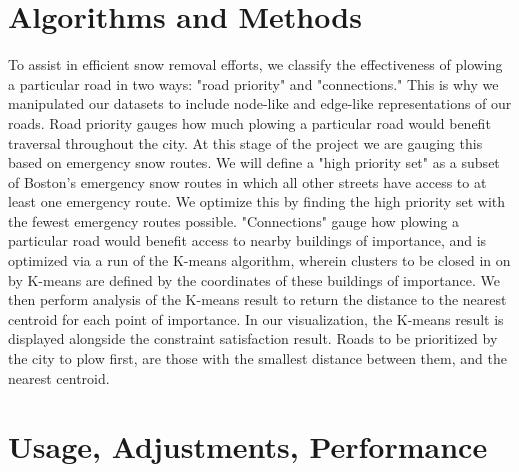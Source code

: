 \documentclass[15pt]{report}
\begin{document}
\section*{Algorithms and Methods}
To assist in efficient snow removal efforts, we classify the effectiveness of plowing a particular road in two ways: "road priority" and "connections." This is why we manipulated our datasets to include node-like and edge-like representations of our roads. Road priority gauges how much plowing a particular road would benefit traversal throughout the city. At this stage of the project we are gauging this based on emergency snow routes. We will define a "high priority set" as a subset of Boston's emergency snow routes in which all other streets have access to at least one emergency route. We optimize this by finding the high priority set with the fewest emergency routes possible. "Connections" gauge how plowing a particular road would benefit access to nearby buildings of importance, and is optimized via a run of the K-means algorithm, wherein clusters to be closed in on by K-means are defined by the coordinates of these buildings of importance. We then perform analysis of the K-means result to return the distance to the nearest centroid for each point of importance.
In our visualization, the K-means result is displayed alongside the constraint satisfaction result. Roads to be prioritized by the city to plow first, are those with the smallest distance between them, and the nearest centroid.

\section*{Usage, Adjustments, Performance}
\end{document}
